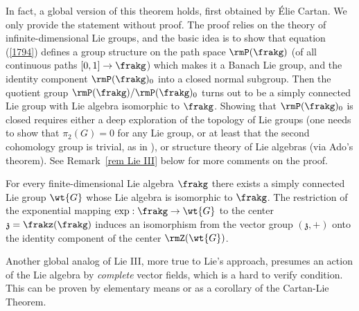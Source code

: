 In fact, a global version of this theorem holds, first obtained by \'Elie Cartan. We only provide the statement without proof. The proof relies on the theory of infinite-dimensional Lie groups, and the basic idea is to show that equation (\ref{1794}) defines a group structure on the path space $\rmP(\frakg)$ (of all continuous paths $[0,1]\to \frakg$) which makes it a Banach Lie group, and the identity component $\rmP(\frakg)_0$ into a closed normal subgroup. Then the quotient group $\rmP(\frakg)/\rmP(\frakg)_0$ turns out to be a simply connected Lie group with Lie algebra isomorphic to $\frakg$. Showing that $\rmP(\frakg)_0$ is closed requires either a deep exploration of the topology of Lie groups (one needs to show that $\pi_2(G)=0$ for any Lie group, or at least that the second cohomology group is trivial, as in \cite{DK}), or structure theory of Lie algebras (via Ado's theorem). See Remark~\ref{rem Lie III} below for more comments on the proof.

\begin{thm}\label{thm 1.14.3 DK global Lie's third}
    For every finite-dimensional Lie algebra $\frakg$ there exists a simply connected Lie group $\wt{G}$ whose Lie algebra is isomorphic to $\frakg$. The restriction of the exponential mapping $\exp:\frakg\to\wt{G}$ to the center $\mathfrak{z}=\frakz(\frakg)$ induces an isomorphism from the vector group $(\mathfrak{z},+)$ onto the identity component of the center $\rmZ(\wt{G})$.
\end{thm}

Another global analog of Lie III, more true to Lie's approach, presumes an action of the Lie algebra by \emph{complete} vector fields, which is a hard to verify condition. This can be proven by elementary means or as a corollary of the Cartan-Lie Theorem.

